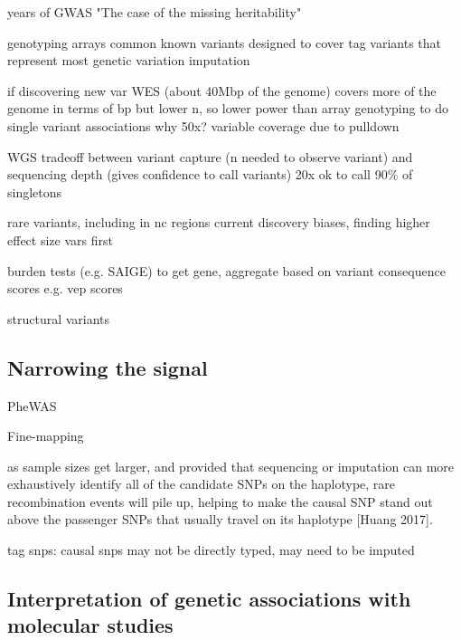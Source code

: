 \begin{outline}

     years of GWAS
    \1 "The case of the missing heritability"

    \1 genotyping arrays
        \2 common known variants
        \2 designed to cover tag variants that represent most genetic variation
        \2 imputation

    \1 if discovering new var
    \1 WES (about 40Mbp of the genome)
        \2 covers more of the genome in terms of bp
        \2 but lower n, so lower power than array genotyping to do single variant associations
        \2 why 50x? variable coverage due to pulldown 

    \1 WGS
        \2 tradeoff between variant capture (n needed to observe variant) and sequencing depth (gives confidence to call variants)
        \2 20x ok to call 90\% of singletons

        \2 rare variants, including in nc regions
            \3 current discovery biases, finding higher effect size vars first

            \3 burden tests (e.g. SAIGE)
                \4 to get gene, aggregate based on variant consequence scores e.g. vep scores

        \2 structural variants

\end{outline}

\subsection{Narrowing the signal}

\begin{outline}

\1 PheWAS\autocite{verma2017CurrentScopeChallenges}

\1 Fine-mapping

    \2 as sample sizes get larger, and provided that sequencing or imputation can more exhaustively identify all of the candidate SNPs on the haplotype, rare recombination events will pile up, helping to make the causal SNP stand out above the passenger SNPs that usually travel on its haplotype [Huang 2017].

    \2 tag snps: causal snps may not be directly typed, may need to be imputed

\end{outline}

\subsection{Interpretation of genetic associations with molecular studies}

